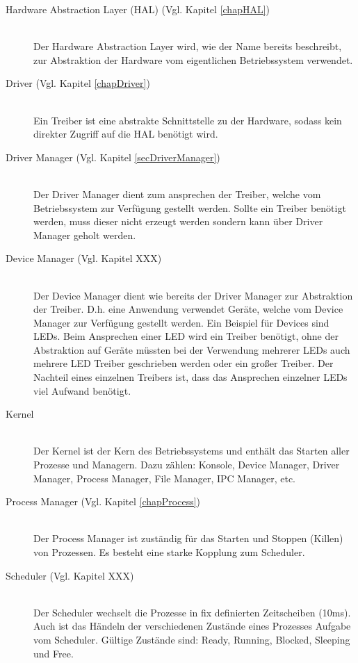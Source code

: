 \begin{description}
	\item[Hardware Abstraction Layer (HAL) (Vgl. Kapitel \ref{chapHAL})] \hfill \\
	Der Hardware Abstraction Layer wird, wie der Name bereits beschreibt, zur Abstraktion der Hardware vom eigentlichen Betriebssystem verwendet.
	
	\item[Driver (Vgl. Kapitel \ref{chapDriver})] \hfill \\
	Ein Treiber ist eine abstrakte Schnittstelle zu der Hardware, sodass kein direkter Zugriff auf die HAL benötigt wird.
	
	\item[Driver Manager (Vgl. Kapitel \ref{secDriverManager})] \hfill \\
	Der Driver Manager dient zum ansprechen der Treiber, welche vom Betriebssystem zur Verfügung gestellt werden. Sollte ein Treiber benötigt werden, muss dieser nicht erzeugt werden sondern kann über Driver Manager geholt werden. 
	
	\item[Device Manager (Vgl. Kapitel XXX)] \hfill \\
	Der Device Manager dient wie bereits der Driver Manager zur Abstraktion der Treiber. D.h. eine Anwendung verwendet Geräte, welche vom Device Manager zur Verfügung gestellt werden. Ein Beispiel für Devices sind LEDs. Beim Ansprechen einer LED wird ein Treiber benötigt, ohne der Abstraktion auf Geräte müssten bei der Verwendung mehrerer LEDs auch mehrere LED Treiber geschrieben werden oder ein großer Treiber. Der Nachteil eines einzelnen Treibers ist, dass das Ansprechen einzelner LEDs viel Aufwand benötigt.
	
	\item[Kernel] \hfill \\
	Der Kernel ist der Kern des Betriebssystems und enthält das Starten aller Prozesse und Managern. Dazu zählen: Konsole, Device Manager, Driver Manager, Process Manager, File Manager, IPC Manager, etc.
	
	\item[Process Manager (Vgl. Kapitel \ref{chapProcess})] \hfill \\
	Der Process Manager ist zuständig für das Starten und Stoppen (Killen) von Prozessen. Es besteht eine starke Kopplung zum Scheduler.
	
	\item[Scheduler (Vgl. Kapitel XXX)] \hfill \\
	Der Scheduler wechselt die Prozesse in fix definierten Zeitscheiben (10ms). Auch ist das Händeln der verschiedenen Zustände eines Prozesses Aufgabe vom Scheduler. Gültige Zustände sind: Ready, Running, Blocked, Sleeping und Free.
	

\end{description}
